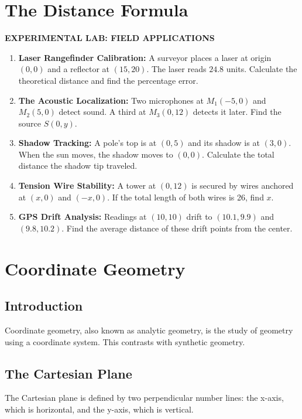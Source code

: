 \chapter{The Distance Formula}
\noindent
\colorbox{practicegreen}{\parbox{\dimexpr\linewidth-2\fboxsep}{\centering\small\bfseries\color{white} EXPERIMENTAL LAB: FIELD APPLICATIONS}}
\vspace{15pt}

\begin{enumerate}
    \item \textbf{Laser Rangefinder Calibration:} A surveyor places a laser at origin $(0,0)$ and a reflector at $(15, 20)$. The laser reads $24.8$ units. Calculate the theoretical distance and find the percentage error.
    \item \textbf{The Acoustic Localization:} Two microphones at $M_1(-5, 0)$ and $M_2(5, 0)$ detect sound. A third at $M_3(0, 12)$ detects it later. Find the source $S(0, y)$.
    \item \textbf{Shadow Tracking:} A pole's top is at $(0, 5)$ and its shadow is at $(3, 0)$. When the sun moves, the shadow moves to $(0, 0)$. Calculate the total distance the shadow tip traveled.
    \item \textbf{Tension Wire Stability:} A tower at $(0, 12)$ is secured by wires anchored at $(x, 0)$ and $(-x, 0)$. If the total length of both wires is 26, find $x$.
    \item \textbf{GPS Drift Analysis:} Readings at $(10, 10)$ drift to $(10.1, 9.9)$ and $(9.8, 10.2)$. Find the average distance of these drift points from the center.
\end{enumerate}

\chapter{Coordinate Geometry}
\section{Introduction}
Coordinate geometry, also known as analytic geometry, is the study of geometry using a coordinate system. This contrasts with synthetic geometry.

\section{The Cartesian Plane}
The Cartesian plane is defined by two perpendicular number lines: the x-axis, which is horizontal, and the y-axis, which is vertical.

